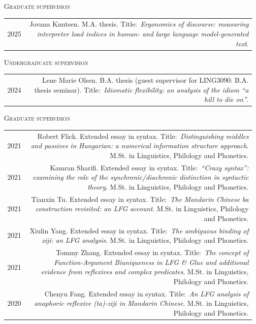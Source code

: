 \documentclass[11pt,a4paper]{article}
\makeatletter
\newlength{\rulelength}%
\newenvironment{cvsection}{%
  \setlength{\extrarowheight}{0.70ex}
  \begin{longtable}[l]{@{} L R @{}}
}{%
  \end{longtable}
}
\newcommand{\cvsubhead}[1]{\noindent\hspace*{\rulelength}\hspace*{9pt} \textsc{#1}\vspace*{0.25\baselineskip}}
\newcommand{\rulesubhead}[1]{\noindent{\color{headercolor}\rule[0.4ex]{\rulelength}{1pt}\hspace*{9pt} {#1}}\vspace*{0.25\baselineskip}}
\makeatother
\begin{document}
\cvsubhead{Graduate supervision}
\begin{cvsection}
  2025 & Jovana Knutsen. M.A. thesis. Title:~\textit{Ergonomics of
    discourse: measuring interpreter load indices in human- and large language
    model-generated text}.
\end{cvsection}

\cvsubhead{Undergraduate supervision}
\begin{cvsection}
  2024 & Lene Marie Olsen. B.A. thesis (guest supervisor for LING3090: B.A.
  thesis seminar). Title:~\textit{Idiomatic flexibility: an analysis of the
    idiom ``a hill to die on''}.%
\end{cvsection}

\rulesubhead{University of Oxford}

\cvsubhead{Graduate supervision}

\begin{cvsection}
  2021 & Robert Flick. Extended essay in syntax. Title:~\textit{Distinguishing
    middles and passives in Hungarian: a numerical information structure
    approach}. M.St. in Linguistics, Philology and Phonetics. \\

  2021 & Kamran Sharifi. Extended essay in syntax. Title:~\textit{``Crazy
    syntax'': examining the role of the synchronic/diachronic distinction in
    syntactic theory}. M.St. in Linguistics, Philology and Phonetics.\\

  2021 & Tianxin Tu. Extended essay in syntax. Title:~\textit{The Mandarin
    Chinese \emph{ba} construction revisited: an LFG account}. M.St. in Linguistics, Philology and Phonetics.\\

  2021 & Xiulin Yang. Extended essay in syntax. Title:~\textit{The ambiguous
    binding of \emph{ziji}: an LFG analysis}. M.St. in Linguistics, Philology and Phonetics.\\

  2021 & Tommy Zhang. Extended essay in syntax. Title:~\textit{The concept of
    Function-Argument Biuniqueness in LFG \& Glue and additional evidence
    from reflexives and complex predicates}. M.St. in Linguistics, Philology and Phonetics.\\

  2020 & Chenyu Fang. Extended essay in syntax. Title:~\textit{An LFG analysis
    of anaphoric reflexive \emph{(ta)-ziji} in Mandarin Chinese}. M.St. in
  Linguistics, Philology and Phonetics.
\end{cvsection}
\end{document}
